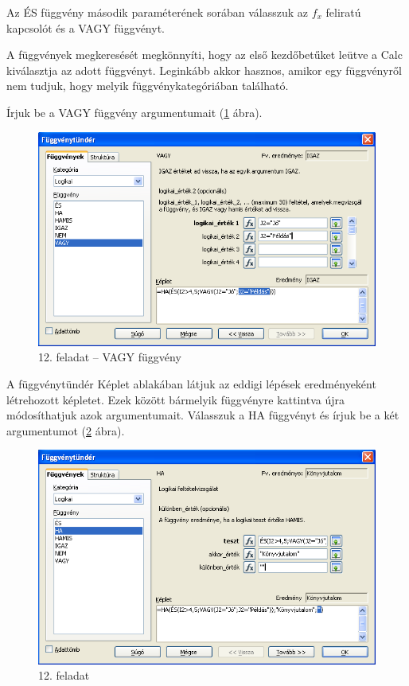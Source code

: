 Az ÉS függvény második paraméterének sorában válasszuk az
$f_x$ feliratú kapcsolót és a VAGY függvényt.

A függvények megkeresését megkönnyíti, hogy az első
kezdőbetűket leütve a Calc kiválasztja az adott
függvényt. Leginkább akkor hasznos, amikor egy
függvényről nem tudjuk, hogy melyik függvénykategóriában található.

Írjuk be a VAGY függvény argumentumait (\ref{12-feladatOR} ábra).

\begin{figure}[!h]
\begin{center}
\includegraphics[width=13.999cm]{oocalcv2-img70.png}
\caption{12.  feladat --  VAGY függvény}\label{12-feladatOR}
\end{center}
\end{figure}

A függvénytündér Képlet ablakában látjuk az eddigi
lépések eredményeként létrehozott képletet. Ezek között
bármelyik függvényre kattintva újra módosíthatjuk azok
argumentumait. Válasszuk a HA függvényt és írjuk be a két
argumentumot (\ref{12-feladatIFArg} ábra).

\begin{figure}[!h]
\begin{center}
\includegraphics[width=13.999cm]{oocalcv2-img71.png}
\caption{12. feladat}\label{12-feladatIFArg}
\end{center}
\end{figure}

